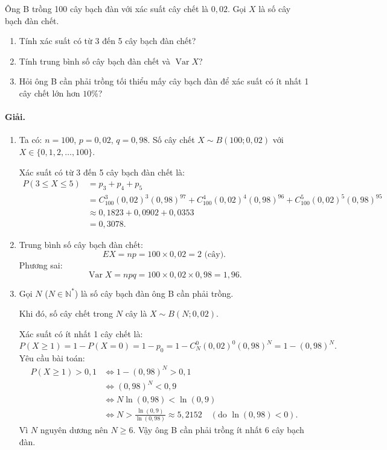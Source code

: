 \begin{vidu}[VD 3]
Ông B trồng 100 cây bạch đàn với xác suất cây chết là $0{,}02$. Gọi $X$ là số cây bạch đàn chết.
\begin{enumerate}[label=\arabic*)]
    \item Tính xác suất có từ 3 đến 5 cây bạch đàn chết?
    \item Tính trung bình số cây bạch đàn chết và $\operatorname{Var} X$?
    \item Hỏi ông B cần phải trồng tối thiểu mấy cây bạch đàn để xác suất có ít nhất 1 cây chết lớn hơn $10\%$?
\end{enumerate}

\paragraph{Giải.}
\begin{enumerate}[label=\arabic*)]
    \item Ta có: $n = 100$, $p = 0{,}02$, $q = 0{,}98$. Số cây chết $X \sim B(100; 0{,}02)$ với $X \in \{0, 1, 2, \dots, 100\}$.
    
    Xác suất có từ 3 đến 5 cây bạch đàn chết là:
    \begin{align*}
    P(3 \le X \le 5) &= p_3 + p_4 + p_5 \\
    &= C_{100}^3 (0{,}02)^3 (0{,}98)^{97} + C_{100}^4 (0{,}02)^4 (0{,}98)^{96} + C_{100}^5 (0{,}02)^5 (0{,}98)^{95} \\
    &\approx 0{,}1823 + 0{,}0902 + 0{,}0353 \\
    &= 0{,}3078.
    \end{align*}

    \item Trung bình số cây bạch đàn chết:
    \[
    EX = np = 100 \times 0{,}02 = 2 \text{ (cây)}.
    \]
    Phương sai:
    \[
    \operatorname{Var} X = npq = 100 \times 0{,}02 \times 0{,}98 = 1{,}96.
    \]

    \item Gọi $N$ ($N \in \mathbb{N}^*$) là số cây bạch đàn ông B cần phải trồng.
    
    Khi đó, số cây chết trong $N$ cây là $X \sim B(N; 0{,}02)$.
    
    Xác suất có ít nhất 1 cây chết là:
    \[
    P(X \ge 1) = 1 - P(X = 0) = 1 - p_0 = 1 - C_N^0 (0{,}02)^0 (0{,}98)^N = 1 - (0{,}98)^N.
    \]
    Yêu cầu bài toán:
    \begin{align*}
    P(X \ge 1) > 0{,}1 &\iff 1 - (0{,}98)^N > 0{,}1 \\
    &\iff (0{,}98)^N < 0{,}9 \\
    &\iff N \ln(0{,}98) < \ln(0{,}9) \\
    &\iff N > \frac{\ln(0{,}9)}{\ln(0{,}98)} \approx 5{,}2152 \quad (\text{do } \ln(0{,}98) < 0).
    \end{align*}
    Vì $N$ nguyên dương nên $N \ge 6$. Vậy ông B cần phải trồng ít nhất 6 cây bạch đàn.
\end{enumerate}
\end{vidu}

